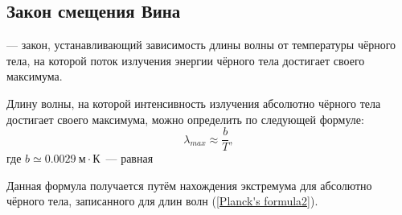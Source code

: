 \subsection{Закон смещения Вина}
 --- закон, устанавливающий зависимость длины волны от температуры чёрного тела, на которой поток излучения энергии чёрного тела достигает своего максимума.

Длину волны, на которой интенсивность излучения абсолютно чёрного тела достигает своего максимума, можно определить по следующей формуле:
\begin{equation}
\lambda_{max} \approx \frac{b}{T},
\end{equation}
где $b \simeq 0.0029~\text{м} \cdot \text{К}$~---  равная

Данная формула получается путём нахождения экстремума  для абсолютно чёрного тела, записанного для длин волн (\ref{Planck's formula2}).

